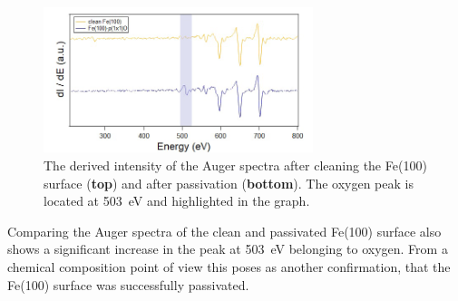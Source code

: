 \begin{figure}[h]
    \centering
    \includegraphics[width = 0.7\textwidth]{Plots/Auger.png}
    \caption{The derived intensity of the Auger spectra after cleaning the Fe(100) surface (\textbf{top}) and after passivation (\textbf{bottom}). The oxygen peak is located at \qty{503}{eV} and highlighted in the graph.}
    \label{fig:auger_FeO}
\end{figure}
\FloatBarrier
Comparing the Auger spectra of the clean and passivated Fe(100) surface also shows a significant increase in the peak at \qty{503}{eV} belonging to oxygen.
From a chemical composition point of view this poses as another confirmation, that the Fe(100) surface was successfully passivated.

